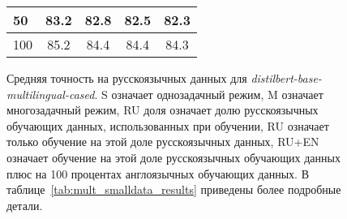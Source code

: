 \begin{figure}[!htbp]
\begin{minipage}{0.45\textwidth}
{\begin{tabular}[baseline={(0,2.1)}]{|l||c|c|c|c|}
50 & 83.2 & 82.8 & 82.5 & 82.3 \\ \hline
100 & 85.2 & 84.4 & 84.4 & 84.3 \\ \hline
\end{tabular}}
\end{minipage}
\caption{Средняя точность на русскоязычных данных для \textit{distilbert-base-multilingual-cased}. S означает однозадачный режим, M означает многозадачный режим, RU доля означает долю русскоязычных обучающих данных, использованных при обучении, RU означает только обучение на этой доле русскоязычных данных, RU+EN означает обучение на этой доле русскоязычных обучающих данных плюс на 100 процентах англоязычных обучающих данных. В таблице~\ref{tab:mult_smalldata_results} приведены более подробные детали.}
\label{fig:tr-ag:ru_dialog_part}
\end{figure}
%

